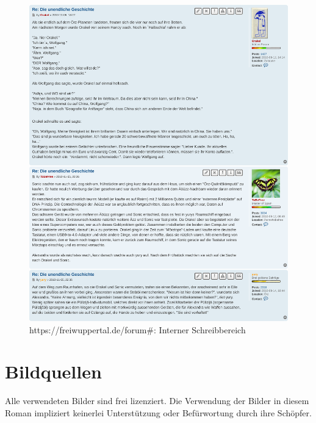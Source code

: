 \begin{figure}[p]
	\includegraphics[width=\linewidth]{include-main-iathread-original-dna.png}
	\caption{https://freiwuppertal.de/forum\#: Interner Schreibbereich}
\end{figure}


\chapter{Bildquellen}

Alle verwendeten Bilder sind frei lizenziert. Die Verwendung der Bilder in diesem Roman impliziert keinerlei Unterstützung oder Befürwortung durch ihre Schöpfer.

